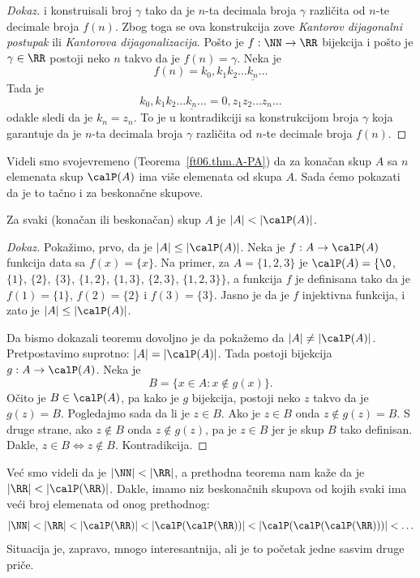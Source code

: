 \begin{proof}[Dokaz]
  i konstruisali broj $\gamma$ tako da je $n$-ta decimala broja $\gamma$ razli\v cita od $n$-te decimale broja $f(n)$.
  Zbog toga se ova konstrukcija
  zove \emph{Kantorov dijagonalni postupak} ili \emph{Kantorova dijagonalizacija}.
  Po\v sto je $f : \NN \to \RR$ bijekcija i po\v sto je $\gamma \in \RR$ postoji neko $n$ takvo da je
  $f(n) = \gamma$. Neka je
  $$
    f(n) = k_0, k_1 k_2 \ldots \underline{k_n} \ldots
  $$
  Tada je
  $$
    k_0, k_1 k_2 \ldots \underline{k_n} \ldots = 0, z_1 z_2 \ldots z_n \ldots
  $$
  odakle sledi da je $k_n = z_n$. To je u kontradikciji sa konstrukcijom broja $\gamma$ koja garantuje da je
  $n$-ta decimala broja $\gamma$ razli\v cita od $n$-te decimale broja $f(n)$.
\end{proof}

Videli smo svojevremeno (Teorema~\ref{ft06.thm.A-PA}) da za kona\v can skup $A$ sa $n$ elemenata
skup $\calP(A)$ ima vi\v se elemenata od skupa $A$. Sada \'cemo pokazati da je to ta\v cno i za
beskona\v cne skupove.

\begin{THM}
  Za svaki (kona\v can ili beskona\v can) skup $A$ je $|A| < |\calP(A)|$.
\end{THM}
\begin{proof}[Dokaz]
  Poka\v zimo, prvo, da je $|A| \le |\calP(A)|$. Neka je $f : A \to \calP(A)$ funkcija data sa
  $f(x) = \{x\}$. Na primer, za $A = \{1, 2, 3\}$ je $\calP(A) = \{\0$, $\{1\}$, $\{2\}$, $\{3\}$, $\{1,2\}$,
  $\{1,3\}$, $\{2,3\}$, $\{1,2,3\}\}$,
  a funkcija $f$ je definisana tako da je $f(1) = \{1\}$, $f(2) = \{2\}$ i $f(3) = \{3\}$.
  Jasno je da je $f$ injektivna funkcija, i zato je $|A| \le |\calP(A)|$.

  Da bismo dokazali teoremu dovoljno je da poka\v zemo da $|A| \ne |\calP(A)|$.
  Pretpostavimo suprotno: $|A| = |\calP(A)|$. Tada postoji bijekcija $g : A \to \calP(A)$. Neka je
  $$
    B = \{ x \in A : x \notin g(x) \}.
  $$
  O\v cito je $B \in \calP(A)$, pa kako je $g$ bijekcija, postoji neko $z$ takvo da je $g(z) = B$.
  Pogledajmo sada da li je $z \in B$. Ako je $z \in B$ onda $z \notin g(z) = B$. S druge strane,
  ako $z \notin B$ onda $z \notin g(z)$, pa je $z \in B$ jer je skup $B$ tako definisan.
  Dakle, $z \in B \Leftrightarrow z \notin B$.
  Kontradikcija.
\end{proof}

Ve\'c smo videli da je $|\NN| < |\RR|$, a prethodna teorema nam ka\v ze da je
\hbox{$|\RR| < |\calP(\RR)|$}. Dakle, imamo niz beskona\v cnih skupova od kojih svaki ima
ve\'ci broj elemenata od onog prethodnog:
$$
  |\NN| < |\RR| < |\calP(\RR)| < |\calP(\calP(\RR))| < |\calP(\calP(\calP(\RR)))| < \ldots
$$
Situacija je, zapravo, mnogo interesantnija, ali je to po\v cetak jedne sasvim druge pri\v ce.







